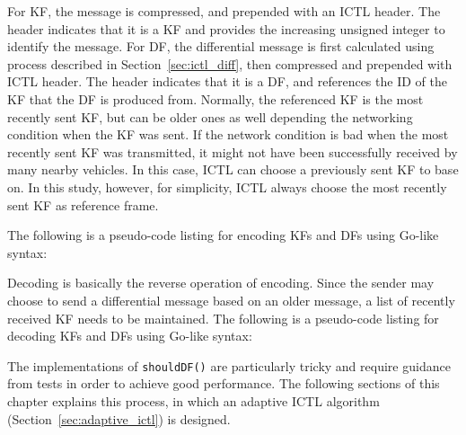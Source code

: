 \documentclass[12pt]{report}
\begin{document}
For KF, the message is compressed, and prepended with an ICTL header. The header indicates that it is a KF and provides the increasing unsigned integer to identify the message. For DF, the differential message is first calculated using process described in Section~\ref{sec:ictl_diff}, then compressed and prepended with ICTL header. The header indicates that it is a DF, and references the ID of the KF that the DF is produced from. Normally, the referenced KF is the most recently sent KF, but can be older ones as well depending the networking condition when the KF was sent. If the network condition is bad when the most recently sent KF was transmitted, it might not have been successfully received by many nearby vehicles. In this case, ICTL can choose a previously sent KF to base on. In this study, however, for simplicity, ICTL always choose the most recently sent KF as reference frame.

The following is a pseudo-code listing for encoding KFs and DFs using Go-like syntax:

\begin{singlespace}
  
\end{singlespace}

Decoding is basically the reverse operation of encoding. Since the sender may choose to send a differential message based on an older message, a list of recently received KF needs to be maintained. The following is a pseudo-code listing for decoding KFs and DFs using Go-like syntax:

\begin{singlespace}
  
\end{singlespace}

The implementations of \texttt{shouldDF()} are particularly tricky and require guidance from tests in order to achieve good performance. The following sections of this chapter explains this process, in which an adaptive ICTL algorithm (Section~\ref{sec:adaptive_ictl}) is designed.
\end{document}
